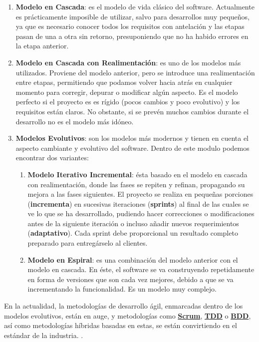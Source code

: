 \begin{enumerate}
    \item {\bfseries Modelo en Cascada}: es el modelo de vida clásico del software. Actualmente es prácticamente imposible de utilizar, salvo para desarrollos muy pequeños, ya que es necesario conocer todos los requisitos con antelación y las etapas pasan de una a otra sin retorno, presuponiendo que no ha habido errores en la etapa anterior.
    \item {\bfseries Modelo en Cascada con Realimentación}: es uno de los modelos más utilizados. Proviene del modelo anterior, pero se introduce una realimentación entre etapas, permitiendo que podamos volver hacia atrás en cualquier momento para corregir, depurar o modificar algún aspecto. Es el modelo perfecto si el proyecto es es rígido (pocos cambios y poco evolutivo) y los requisitos están claros. No obstante, si se prevén muchos cambios durante el desarrollo no es el modelo más idóneo.
    \item {\bfseries Modelos Evolutivos}: son los modelos más modernos y tienen en cuenta el aspecto cambiante y evolutivo del software. Dentro de este modulo podemos encontrar dos variantes:
    \begin{enumerate}[label*=\arabic*.]
        \item {\bfseries Modelo Iterativo Incremental}: ésta basado en el modelo en cascada con realimentación, donde las fases se repiten y refinan, propagando su mejora a las fases siguientes. El proyecto se realiza en pequeñas porciones ({\bfseries incrementa}) en sucesivas iteraciones ({\bfseries sprints}) al final de las cuales se ve lo que se ha desarrollado, pudiendo hacer correcciones o modificaciones antes de la siguiente iteración o incluso añadir nuevos requerimientos ({\bfseries adaptativo}). Cada sprint debe proporcional un resultado completo preparado para entregárselo al clientes.
        \item {\bfseries Modelo en Espiral}: es una combinación del modelo anterior con el modelo en cascada. En éste, el software se va construyendo repetidamente en forma de versiones que son cada vez mejores, debido a que se va incrementando la funcionalidad. Es un modelo muy complejo.
    \end{enumerate}
\end{enumerate}

En la actualidad, la {metodologías de desarrollo ágil}, enmarcadas dentro de los modelos evolutivos, están en auge, y metodologías como {\bfseries \href{https://es.wikipedia.org/wiki/Scrum_(desarrollo_de_software)}{Scrum}}, {\bfseries \href{https://es.wikipedia.org/wiki/Desarrollo_guiado_por_pruebas}{TDD}} o {\bfseries \href{https://es.wikipedia.org/wiki/Desarrollo_guiado_por_comportamiento}{BDD}}, así como metodologías híbridas basadas en estas, se están convirtiendo en el estándar de la industria. \cite{batool01}.

